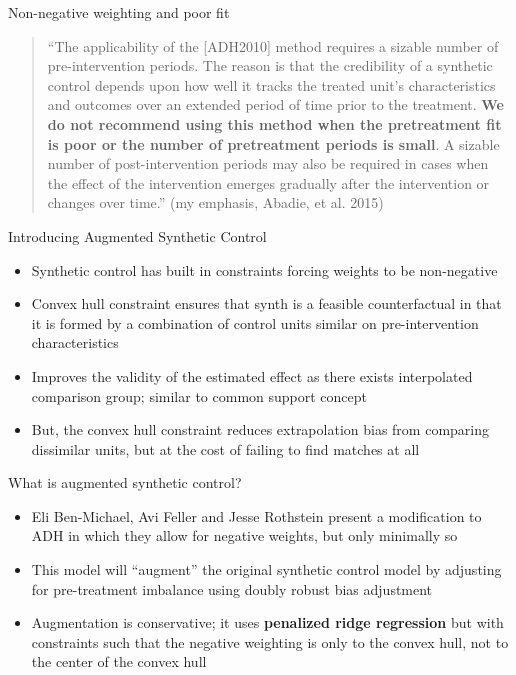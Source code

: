 \documentclass{beamer}
\begin{document}
\begin{frame}{Non-negative weighting and poor fit}

\begin{quote}
``The applicability of the [ADH2010] method requires a sizable number of pre-intervention periods. The reason is that the credibility of a synthetic control depends upon how well it tracks the treated unit’s characteristics and outcomes over an extended period of time prior to the treatment. \textbf{We do not recommend using this method when the pretreatment fit is poor or the number of pretreatment periods is small}. A sizable number of post-intervention periods may also be required in cases when the effect of the intervention emerges gradually after the intervention or changes over time.'' (my emphasis, Abadie, et al. 2015)
\end{quote}

\end{frame}


\begin{frame}{Introducing Augmented Synthetic Control}
\begin{itemize}
\item Synthetic control has built in constraints forcing weights to be non-negative
\item Convex hull constraint ensures that synth is a feasible counterfactual in that it is formed by a combination of control units similar on pre-intervention characteristics
\item Improves the validity of the estimated effect as there exists interpolated comparison group; similar to common support concept
\item But, the convex hull constraint reduces extrapolation bias from comparing dissimilar units, but at the cost of failing to find matches at all
\end{itemize}

\end{frame}



\begin{frame}{What is augmented synthetic control?}

\begin{itemize}
\item Eli Ben-Michael, Avi Feller and Jesse Rothstein present a modification to ADH in which they allow for negative weights, but only minimally so
\item This model will ``augment'' the original synthetic control model by adjusting for pre-treatment imbalance using doubly robust bias adjustment 
\item Augmentation is conservative; it uses \textbf{penalized ridge regression} but with constraints such that the negative weighting is only to the convex hull, not to the center of the convex hull
\end{itemize}

\end{frame}
\end{document}
